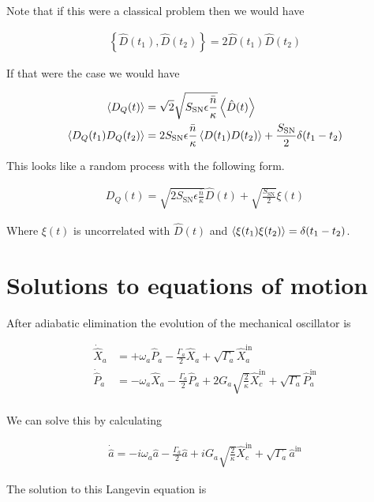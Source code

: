 \documentclass[12pt]{article}
\begin{document}
Note that if this were a classical problem then we would have

\begin{align}
\left\{\hat{D}(t_1),\hat{D}(t_2)\right\} = 2 \hat{D}(t_1)\hat{D}(t_2)
\end{align}

If that were the case we would have

\begin{align}
\Braket{D_Q(t)} &= \sqrt{2} \sqrt{S_{\text{SN}}\epsilon \frac{\bar{n}}{\kappa}}\Braket{\hat{D}(t)}\\
\Braket{D_Q(t_1)D_Q(t_2)} &= 2 S_{\text{SN}}\epsilon \frac{\bar{n}}{\kappa}\Braket{D(t_1)D(t_2)} + \frac{S_{\text{SN}}}{2}\delta(t_1-t_2)
\end{align}

This looks like a random process with the following form.

\begin{align}
D_Q(t) = \sqrt{2 S_{\text{SN}} \epsilon \frac{\bar{n}}{\kappa}} \hat{D}(t) + \sqrt{\frac{S_{\text{SN}}}{2}}\xi(t)
\end{align}

Where $\xi(t)$ is uncorrelated with $\hat{D}(t)$ and $\Braket{\xi(t_1) \xi(t_2)} = \delta(t_1-t_2)$.

\section{Solutions to equations of motion}

After adiabatic elimination the evolution of the mechanical oscillator is

\begin{align}
\dot{\hat{X}}_a &= + \omega_a \hat{P}_a - \frac{\Gamma_a}{2} \hat{X}_a + \sqrt{\Gamma_a} \hat{X}_a^{\text{in}}\\
\dot{\hat{P}}_a &= - \omega_a \hat{X}_a - \frac{\Gamma_a}{2} \hat{P}_a + 2 G_a \sqrt{\frac{2}{\kappa}} \hat{X}_c^{\text{in}} + \sqrt{\Gamma_a} \hat{P}_a^{\text{in}}\\
\end{align}

We can solve this by calculating

\begin{align}
\dot{\hat{a}} = -i\omega_a\hat{a} - \frac{\Gamma_a}{2} \hat{a} + iG_a \sqrt{\frac{2}{\kappa}} \hat{X}_c^{\text{in}} + \sqrt{\Gamma_a}\hat{a}^{\text{in}}
\end{align}

The solution to this Langevin equation is
\end{document}
